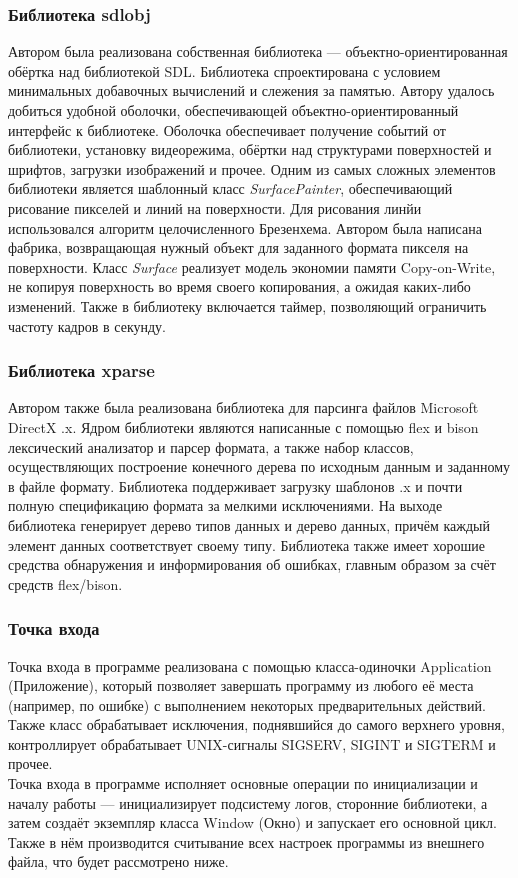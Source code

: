 \documentclass[a4paper,12pt]{report}
\numberwithin{equation}{section}
\begin{document}
\subsubsection{Библиотека sdlobj}
Автором была реализована собственная библиотека --- объектно-ориентированная обёртка над библиотекой SDL. Библиотека спроектирована с условием минимальных добавочных вычислений и слежения за памятью. Автору удалось добиться удобной оболочки, обеспечивающей объектно-ориентированный интерфейс к библиотеке. Оболочка обеспечивает получение событий от библиотеки, установку видеорежима, обёртки над структурами поверхностей и шрифтов, загрузки изображений и прочее. Одним из самых сложных элементов библиотеки является шаблонный класс \textit{SurfacePainter}, обеспечивающий рисование пикселей и линий на поверхности. Для рисования линйи использовался алгоритм целочисленного Брезенхема. Автором была написана фабрика, возвращающая нужный объект для заданного формата пикселя на поверхности. Класс \textit{Surface} реализует модель экономии памяти Copy-on-Write, не копируя поверхность во время своего копирования, а ожидая каких-либо изменений. Также в библиотеку включается таймер, позволяющий ограничить частоту кадров в секунду.

\subsubsection{Библиотека xparse}
Автором также была реализована библиотека для парсинга файлов Microsoft DirectX .x. Ядром библиотеки являются написанные с помощью flex и bison лексический анализатор и парсер формата, а также набор классов, осуществляющих построение конечного дерева по исходным данным и заданному в файле формату. Библиотека поддерживает загрузку шаблонов .x и почти полную спецификацию формата за мелкими исключениями. На выходе библиотека генерирует дерево типов данных и дерево данных, причём каждый элемент данных соответствует своему типу. Библиотека также имеет хорошие средства обнаружения и информирования об ошибках, главным образом за счёт средств flex/bison.

\subsubsection{Точка входа}
Точка входа в программе реализована с помощью класса-одиночки Application (Приложение), который позволяет завершать программу из любого её места (например, по ошибке) с выполнением некоторых предварительных действий. Также класс обрабатывает исключения, поднявшийся до самого верхнего уровня, контроллирует обрабатывает UNIX-сигналы SIGSERV, SIGINT и SIGTERM и прочее. \\
Точка входа в программе исполняет основные операции по инициализации и началу работы --- инициализирует подсистему логов, сторонние библиотеки, а затем создаёт экземпляр класса Window (Окно) и запускает его основной цикл. Также в нём производится считывание всех настроек программы из внешнего файла, что будет рассмотрено ниже.
\end{document}
